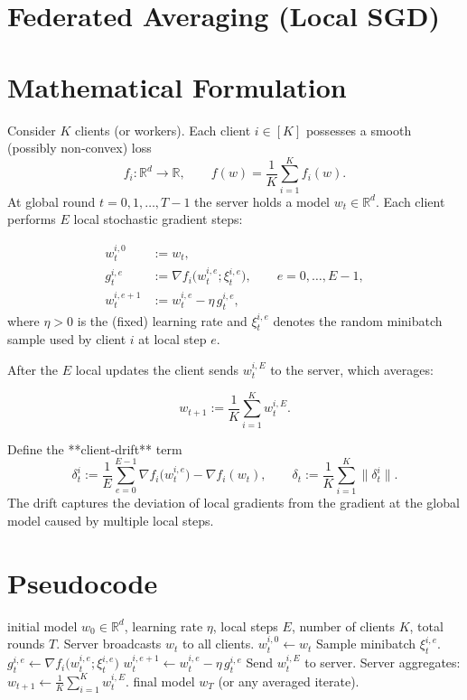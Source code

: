 \documentclass{article}
\newcommand{\R}{\mathbb{R}}
\begin{document}
\section*{Federated Averaging (Local SGD)}

\section*{Mathematical Formulation}
Consider $K$ clients (or workers).  
Each client $i\in [K]$ possesses a smooth (possibly non‑convex) loss 
\[
f_i:\R^d\to\R,\qquad 
f(w)=\frac1K\sum_{i=1}^K f_i(w).
\]
At global round $t=0,1,\dots,T-1$ the server holds a model $w_t\in\R^d$.
Each client performs $E$ local stochastic gradient steps:

\[
\begin{aligned}
w_{t}^{i,0} &:= w_t,\\
g_{t}^{i,e} &:= \nabla f_i\!\bigl(w_{t}^{i,e};\xi_{t}^{i,e}\bigr),\qquad 
e=0,\dots,E-1,\\
w_{t}^{i,e+1} &:= w_{t}^{i,e}-\eta\, g_{t}^{i,e},
\end{aligned}
\]
where $\eta>0$ is the (fixed) learning rate and $\xi_{t}^{i,e}$ denotes the random minibatch
sample used by client $i$ at local step $e$.

After the $E$ local updates the client sends $w_{t}^{i,E}$ to the server, which averages:

\[
w_{t+1}:=\frac1K\sum_{i=1}^K w_{t}^{i,E}.
\]

Define the **client‑drift** term
\[
\delta_{t}^{i}:=\frac1E\sum_{e=0}^{E-1}\nabla f_i\!\bigl(w_{t}^{i,e}\bigr)-\nabla f_i(w_t),
\qquad 
\delta_t:=\frac1K\sum_{i=1}^K\|\delta_{t}^{i}\|.
\]
The drift captures the deviation of local gradients from the gradient at the global
model caused by multiple local steps.

\section*{Pseudocode}
\begin{algorithm}[H]
\caption{Federated Averaging (Local SGD)}\label{alg:FedAvg}
\begin{algorithmic}[1]
 initial model $w_0\in\R^d$, learning rate $\eta$, local steps $E$, number of clients $K$, total rounds $T$.
    \STATE Server broadcasts $w_t$ to all clients.
        \STATE $w_{t}^{i,0}\gets w_t$
            \STATE Sample minibatch $\xi_{t}^{i,e}$.
            \STATE $g_{t}^{i,e}\gets \nabla f_i\!\bigl(w_{t}^{i,e};\xi_{t}^{i,e}\bigr)$
            \STATE $w_{t}^{i,e+1}\gets w_{t}^{i,e}-\eta\,g_{t}^{i,e}$
        \ENDFOR
        \STATE Send $w_{t}^{i,E}$ to server.
    \ENDFOR
    \STATE Server aggregates: $w_{t+1}\gets \frac1K\sum_{i=1}^K w_{t}^{i,E}$.
\ENDFOR
{} final model $w_T$ (or any averaged iterate).
\end{algorithmic}
\end{algorithm}
\end{document}
